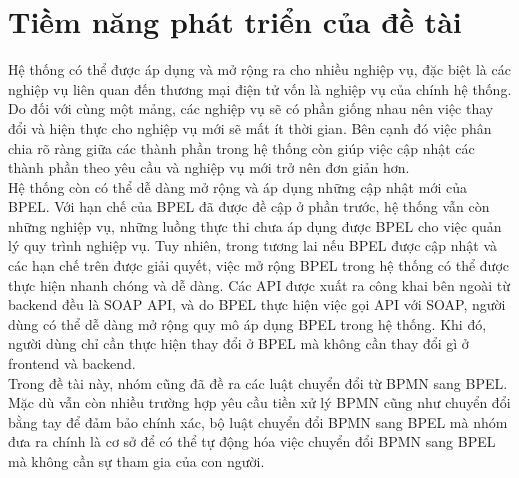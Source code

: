 \section{Tiềm năng phát triển của đề tài}
\hspace{0.5cm} Hệ thống có thể được áp dụng và mở rộng ra cho nhiều nghiệp vụ, đặc biệt là các nghiệp vụ liên quan đến thương mại điện tử vốn là nghiệp vụ của chính hệ thống. Do đối với cùng một mảng, các nghiệp vụ sẽ có phần giống nhau nên việc thay đổi và hiện thực cho nghiệp vụ mới sẽ mất ít thời gian. Bên cạnh đó việc phân chia rõ ràng giữa các thành phần trong hệ thống còn giúp việc cập nhật các thành phần theo yêu cầu và nghiệp vụ mới trở nên đơn giản hơn.\\

Hệ thống còn có thể dễ dàng mở rộng và áp dụng những cập nhật mới của BPEL. Với hạn chế của BPEL đã được đề cập ở phần trước, hệ thống vẫn còn những nghiệp vụ, những luồng thực thi chưa áp dụng được BPEL cho việc quản lý quy trình nghiệp vụ. Tuy nhiên, trong tương lai nếu BPEL được cập nhật và các hạn chế trên được giải quyết, việc mở rộng BPEL trong hệ thống có thể được thực hiện nhanh chóng và dễ dàng. Các API được xuất ra công khai bên ngoài từ backend đều là SOAP API, và do BPEL thực hiện việc gọi API với SOAP, người dùng có thể dễ dàng mở rộng quy mô áp dụng BPEL trong hệ thống. Khi đó, người dùng chỉ cần thực hiện thay đổi ở BPEL mà không cần thay đổi gì ở frontend và backend.\\

Trong đề tài này, nhóm cũng đã đề ra các luật chuyển đổi từ BPMN sang BPEL. Mặc dù vẫn còn nhiều trường hợp yêu cầu tiền xử lý BPMN cũng như chuyển đổi bằng tay để đảm bảo chính xác, bộ luật chuyển đổi BPMN sang BPEL mà nhóm đưa ra chính là cơ sở để có thể tự động hóa việc chuyển đổi BPMN sang BPEL mà không cần sự tham gia của con người.







